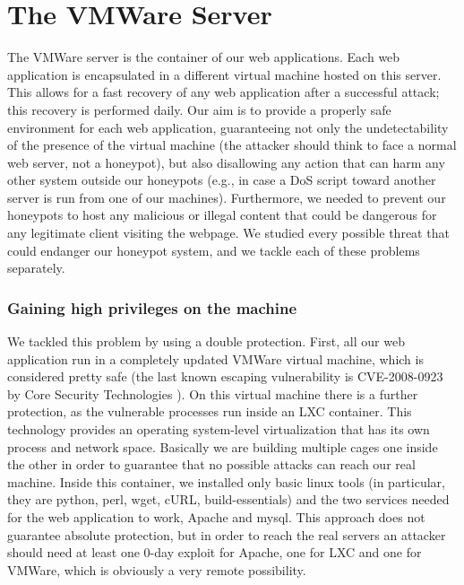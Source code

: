 \section{The VMWare Server}
\label{sec:vwmwareserver}

The VMWare server is the container of our web applications. Each web application is encapsulated in a different virtual machine hosted on this server. This allows for a fast recovery of any web application after a successful attack; this recovery is performed daily.
Our aim is to provide a properly safe environment for each web application, guaranteeing not only the undetectability of the presence of the virtual machine (the attacker should think to face a normal web server, not a honeypot), but also disallowing any action that can harm any other system outside our honeypots (e.g., in case a DoS script toward another server is run from one of our machines). Furthermore, we needed to prevent our honeypots to host any malicious or illegal content that could be dangerous for any legitimate client visiting the webpage.
We studied every possible threat that could endanger our honeypot system, and we tackle each of these problems separately.

\subsubsection{Gaining high privileges on the machine}

 We tackled this problem by using a double protection. First, all our web application run in a completely updated VMWare virtual machine, which is considered pretty safe (the last known escaping vulnerability is CVE-2008-0923 by Core Security Technologies \cite{vmescape}). On this virtual machine there is a further protection, as the vulnerable processes run inside an LXC container. This technology provides an operating system-level virtualization that has its own process and network space. Basically we are building multiple cages one inside the other in order to guarantee that no possible attacks can reach our real machine. Inside this container, we installed only basic linux tools (in particular, they are python, perl, wget, cURL, build-essentials) and the two services needed for the web application to work, Apache and mysql. This approach does not guarantee absolute protection, but in order to reach the real servers an attacker should need at least one 0-day exploit for Apache, one for LXC and one for VMWare, which is obviously a very remote possibility.

